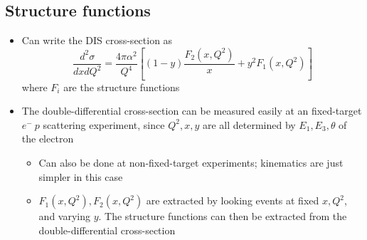 \documentclass[11pt]{article}
\newcommand{\dd}[2]{\dfrac{d #1}{d #2}}
\newcommand{\el}{\ensuremath{e^{-}}\xspace}
\begin{document}
\subsection{Structure functions}
\begin{itemize}
  \item Can write the DIS cross-section as
  \begin{equation}
    \dd{^2\sigma}{xdQ^2} = \frac{4\pi\alpha^2}{Q^4} \left[(1-y)\frac{F_2(x,Q^2)}{x}+y^2F_1(x,Q^2)\right]
  \end{equation}
  where $F_i$ are the structure functions
  \item The double-differential cross-section can be measured easily at an fixed-target $\el~p$ scattering experiment, since $Q^2,x,y$ are all determined by $E_1, E_3,\theta$ of the electron 
  \begin{itemize}
    \item Can also be done at non-fixed-target experiments; kinematics are just simpler in this case
    \item $F_1(x,Q^2),F_2(x,Q^2)$ are extracted by looking events at fixed $x,Q^2$, and varying $y$. The structure functions can then be extracted from the double-differential cross-section
  \end{itemize}
\end{itemize}
\end{document}
